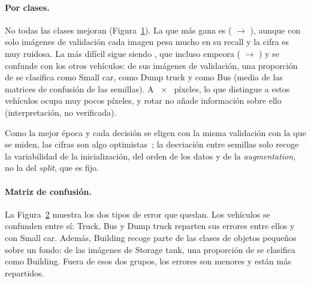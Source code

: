 \paragraph{Por clases.} No todas las clases mejoran (Figura~\ref{fig:final}). La que más gana es
 ( $\rightarrow$ ), aunque con solo
 imágenes de validación cada imagen pesa mucho en su recall y la cifra es muy ruidosa. La más
difícil sigue siendo , que incluso empeora ( $\rightarrow$
) y se confunde con los otros vehículos: de sus imágenes de validación, una proporción de
 se clasifica como Small car,  como Dump truck y
 como Bus (media de las matrices de confusión de las  semillas). A
~$\times$~ píxeles, lo que distingue a estos vehículos ocupa muy pocos píxeles, y rotar
no añade información sobre ello (interpretación, no verificada).

Como la mejor época y cada decisión se eligen con la misma validación con la que se miden, las cifras son algo
optimistas~\cite{cawley}; la desviación entre semillas solo recoge la variabilidad de la inicialización, del orden de
los datos y de la \emph{augmentation}, no la del \emph{split}, que es fijo.

\begin{figure}[!htbp]
  \centering
  \caption{}
  \label{fig:final}
\end{figure}

\paragraph{Matriz de confusión.} La Figura~\ref{fig:confusion} muestra los dos tipos de error que quedan. Los vehículos se
confunden entre sí: Truck, Bus y Dump truck reparten sus errores entre ellos y con Small car. Además, Building recoge
parte de las clases de objetos pequeños sobre un fondo: de las imágenes de Storage tank, una proporción de
 se clasifica como Building. Fuera de esos dos grupos, los errores son
menores y están más repartidos.

\begin{figure}[!htbp]
  \centering
  \caption{}
  \label{fig:confusion}
\end{figure}
